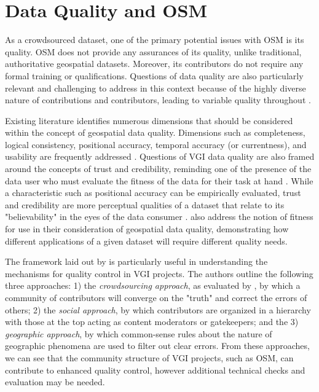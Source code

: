 \section{Data Quality and OSM}

As a crowdsourced dataset, one of the primary potential issues with OSM is its quality. OSM does not provide any assurances of its quality, unlike traditional, authoritative geospatial datasets. Moreover, its contributors do not require any formal training or qualifications. Questions of data quality are also particularly relevant and challenging to address in this context because of the highly diverse nature of contributions and contributors, leading to variable quality throughout  \parencite{grochenig_digging_2014, haklay_how_2010, neis_analyzing_2012, girres_quality_2010}. 

Existing literature identifies numerous dimensions that should be considered within the concept of geospatial data quality. Dimensions such as completeness, logical consistency, positional accuracy, temporal accuracy (or currentness), and usability are frequently addressed \parencite{fox_notion_1994, antoniou_measures_2015, van_oort_spatial_2006}. Questions of VGI data quality are also framed around the concepts of trust and credibility, reminding one of the presence of the data user who must evaluate the fitness of the data for their task at hand \parencite{flanagin_credibility_2008, severinsen_vgtrust_2019}. While a characteristic such as positional accuracy can be empirically evaluated, trust and credibility are more perceptual qualities of a dataset that relate to its "believability" in the eyes of the data consumer \parencite{flanagin_credibility_2008}. \textcite{barron_comprehensive_2014} also address the notion of fitness for use in their consideration of geospatial data quality, demonstrating how different applications of a given dataset will require different quality needs. 

The framework laid out by \textcite{goodchild_assuring_2012} is particularly useful in understanding the mechanisms for quality control in VGI projects. The authors outline the following three approaches: 1) the \textit{crowdsourcing approach}, as evaluated by \textcite{haklay_how_2010-1}, by which a community of contributors will converge on the "truth" and correct the errors of others; 2) the \textit{social approach}, by which contributors are organized in a hierarchy with those at the top acting as content moderators or gatekeepers; and the 3) \textit{geographic approach}, by which common-sense rules about the nature of geographic phenomena are used to filter out clear errors. From these approaches, we can see that the community structure of VGI projects, such as OSM, can contribute to enhanced quality control, however additional technical checks and evaluation may be needed.

